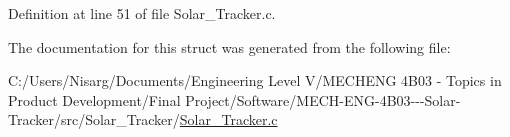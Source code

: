 Definition at line 51 of file Solar\+\_\+\+Tracker.\+c.



The documentation for this struct was generated from the following file\+:\begin{DoxyCompactItemize}
\item 
C\+:/\+Users/\+Nisarg/\+Documents/\+Engineering Level V/\+M\+E\+C\+H\+E\+N\+G 4\+B03 -\/ Topics in Product Development/\+Final Project/\+Software/\+M\+E\+C\+H-\/\+E\+N\+G-\/4\+B03-\/-\/-\/\+Solar-\/\+Tracker/src/\+Solar\+\_\+\+Tracker/\hyperlink{_solar___tracker_8c}{Solar\+\_\+\+Tracker.\+c}\end{DoxyCompactItemize}
